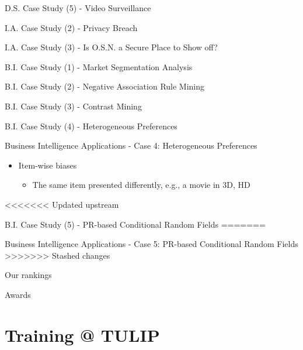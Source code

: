 \documentclass[
 size=14pt,
 paper=smartboard,  %
 mode=present, 		%
 display=slides, 	%
 style=tuliplab,  	%
 pauseslide,
 fleqn,leqno]{powerdot}
\begin{document}
\begin{slide}[toc=,bm=]{D.S. Case Study (5) - Video Surveillance}
\begin{slide}[toc=,bm=]{I.A. Case Study (2) - Privacy Breach}
\begin{slide}[toc=,bm=]{I.A. Case Study (3) - Is O.S.N. a Secure Place to Show off?}
\begin{slide}[toc=,bm=]{B.I. Case Study (1) - Market Segmentation Analysis}
\begin{slide}[toc=,bm=]{B.I. Case Study (2) - Negative Association Rule Mining}
\begin{slide}[toc=,bm=]{B.I. Case Study (3) - Contrast Mining}
\begin{slide}[toc=,bm=]{B.I. Case Study (4) - Heterogeneous Preferences}
\begin{slide}[toc=,bm=]{Business Intelligence Applications - Case 4: Heterogeneous Preferences}
\begin{itemize}
\begin{itemize}
\end{itemize}

\item
Item-wise biases

\begin{itemize}
\item
The same item presented differently,
e.g., a movie in 3D, HD

\end{itemize}
\end{itemize}
\end{slide}


<<<<<<< Updated upstream
\begin{slide}[toc=,bm=]{B.I. Case Study (5) - PR-based Conditional Random Fields}
=======
\begin{slide}[toc=,bm=]{Business Intelligence Applications - Case 5: PR-based Conditional Random Fields}
>>>>>>> Stashed changes


\end{slide}

\begin{slide}[toc=,bm=]{Our rankings}


\end{slide}

\begin{slide}[toc=,bm=]{Awards}


\end{slide}


\section{Training @ TULIP}



\end{slide}
\end{slide}
\end{slide}
\end{slide}
\end{slide}
\end{slide}
\end{slide}
\end{slide}
\end{document}
